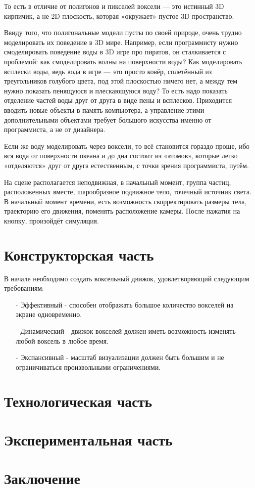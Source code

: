 \documentclass[a4paper,14pt]{article} %
\newcommand{\anonsection}[1]{\section*{#1}\addcontentsline{toc}{section}{#1}}
\begin{document}
	То есть в отличие от полигонов и пикселей воксели — это истинный 3D кирпичик, а не 2D плоскость, которая «окружает» пустое 3D пространство.

	Ввиду того, что полигональные модели пусты по своей природе, очень трудно моделировать их поведение в 3D мире. Например, если программисту нужно смоделировать поведение воды в 3D игре про пиратов, он сталкивается с проблемой: как смоделировать волны на поверхности воды? Как моделировать всплески воды, ведь вода в игре — это просто ковёр, сплетённый из треугольников голубого цвета, под этой плоскостью ничего нет, а между тем нужно показать пенящуюся и плескающуюся воду? То есть надо показать отделение частей воды друг от друга в виде пены и всплесков. Приходится вводить новые объекты в память компьютера, а управление этими дополнительными объектами требует большого искусства именно от программиста, а не от дизайнера.

	Если же воду моделировать через воксели, то всё становится гораздо проще, ибо вся вода от поверхности океана и до дна состоит из «атомов», которые легко «отделяются» друг от друга естественным, с точки зрения программиста, путём.

	На сцене располагается неподвижная, в начальный момент, группа частиц, расположенных вместе, шарообразное подвижное тело, точечный источник света.
В начальный момент времени, есть возможность скорректировать размеры тела, траекторию его движения, поменять расположение камеры.
После нажатия на кнопку, произойдёт симуляция.
        
	\newpage

	\section{Конструкторская часть}
	
	\hfill
	
	В начале необходимо создать воксельный движок, удовлетворяющий следующим требованиям:
	\begin{enumerate}
	\item[-] Эффективный - способен отображать большое количество вокселей на экране одновременно.

	\item[-] Динамический - движок вокселей должен иметь возможность изменять любой воксель в любое время.

	\item[-] Экспансивный - масштаб визуализации должен быть большим и не ограничиваться произвольными ограничениями.
	\end{enumerate}
	
	\newpage
	\section{Технологическая часть}
	\hfill
	\newpage
        
	\section{Экспериментальная часть}
	\hfill
	\newpage

	\anonsection{Заключение}
	\hfill
 	\newpage

	\begin{thebibliography}{}
        		\bibitem{}
	\end{thebibliography} 
\end{document}
